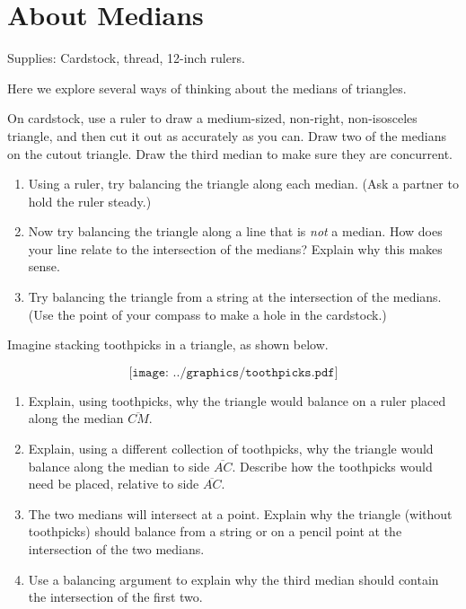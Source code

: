 \newpage

\section{About Medians}
\begin{teachingnote}
Supplies:  Cardstock, thread, 12-inch rulers.
\end{teachingnote}
Here we explore several ways of thinking about the medians of triangles.  

\begin{prob}  
On cardstock, use a ruler to draw a medium-sized, non-right, non-isosceles triangle, and then cut it out as accurately as you can.  Draw two of the medians on the cutout triangle.  Draw the third median to make sure they are concurrent.  
\begin{enumerate}
\item Using a ruler, try balancing the triangle along each median.  (Ask a partner to hold the ruler steady.)  
\item Now try balancing the triangle along a line that is \emph{not} a median.  How does your line relate to the intersection of the medians?  Explain why this makes sense.  
\item Try balancing the triangle from a string at the intersection of the medians.  (Use the point of your compass to make a hole in the cardstock.)
\end{enumerate}

\end{prob}

\begin{prob}
Imagine stacking toothpicks in a triangle, as shown below.  

$$\texttt{[image: ../graphics/toothpicks.pdf]}$$

\begin{enumerate}
\item Explain, using toothpicks, why the triangle would balance on a ruler placed along the median $\overline{CM}$.  
\item Explain, using a different collection of toothpicks, why the triangle would balance along the median to side $\overline{AC}$.  Describe how the toothpicks would need be placed, relative to side $\overline{AC}$.
\item The two medians will intersect at a point.  Explain why the triangle (without toothpicks) should balance from a string or on a pencil point at the intersection of the two medians.  
\item Use a balancing argument to explain why the third median should contain the intersection of the first two.  
\end{enumerate}
\end{prob}


